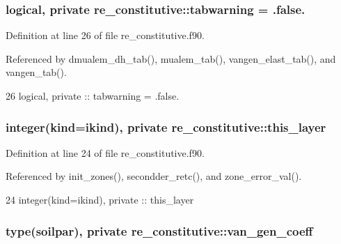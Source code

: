 \subsubsection[{tabwarning}]{\setlength{\rightskip}{0pt plus 5cm}logical, private re\+\_\+constitutive\+::tabwarning = .false.\hspace{0.3cm}{\ttfamily [private]}}\label{namespacere__constitutive_a732d67fdcdd4cdc0fb573d3c9e96ba85}


Definition at line 26 of file re\+\_\+constitutive.\+f90.



Referenced by dmualem\+\_\+dh\+\_\+tab(), mualem\+\_\+tab(), vangen\+\_\+elast\+\_\+tab(), and vangen\+\_\+tab().


\begin{DoxyCode}
26   \textcolor{keywordtype}{logical}, \textcolor{keywordtype}{private} :: tabwarning = .false.
\end{DoxyCode}
\subsubsection[{this\+\_\+layer}]{\setlength{\rightskip}{0pt plus 5cm}integer(kind=ikind), private re\+\_\+constitutive\+::this\+\_\+layer\hspace{0.3cm}{\ttfamily [private]}}\label{namespacere__constitutive_a957329345fdf54666f10d5a560c219db}


Definition at line 24 of file re\+\_\+constitutive.\+f90.



Referenced by init\+\_\+zones(), secondder\+\_\+retc(), and zone\+\_\+error\+\_\+val().


\begin{DoxyCode}
24   \textcolor{keywordtype}{integer(kind=ikind)}, \textcolor{keywordtype}{private} :: this_layer
\end{DoxyCode}
\subsubsection[{van\+\_\+gen\+\_\+coeff}]{\setlength{\rightskip}{0pt plus 5cm}type({\bf soilpar}), private re\+\_\+constitutive\+::van\+\_\+gen\+\_\+coeff\hspace{0.3cm}{\ttfamily [private]}}\label{namespacere__constitutive_ac6e1df1932a050970ae8b9c032047ad7}


